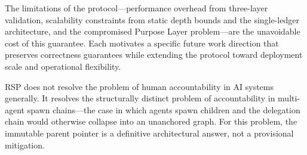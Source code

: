 The limitations of the protocol---performance overhead from three-layer validation, scalability constraints from static depth bounds and the single-ledger architecture, and the compromised Purpose Layer problem---are the unavoidable cost of this guarantee. Each motivates a specific future work direction that preserves correctness guarantees while extending the protocol toward deployment scale and operational flexibility.

RSP does not resolve the problem of human accountability in AI systems generally. It resolves the structurally distinct problem of accountability in multi-agent spawn chains---the case in which agents spawn children and the delegation chain would otherwise collapse into an unanchored graph. For this problem, the immutable parent pointer is a definitive architectural answer, not a provisional mitigation.
